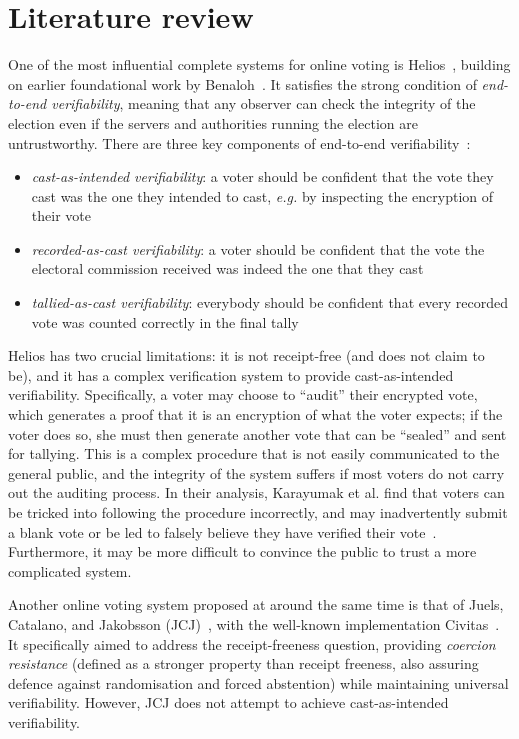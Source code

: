 \documentclass[12pt,a4paper]{article}
\theoremstyle{definition}
\newcommand{\eg}{\textit{e.g. }}
\begin{document}
\section{Literature review}\label{sec-litrev}
One of the most influential complete systems for online voting is Helios~\cite{adida2008helios}, building on earlier foundational work by Benaloh~\cite{benaloh2006simple}. It satisfies the strong condition of \textit{end-to-end verifiability}, meaning that any observer can check the integrity of the election even if the servers and authorities running the election are untrustworthy. There are three key components of end-to-end verifiability~\cite{DBLP:journals/corr/BenalohRRSTV15}:

\begin{itemize}
    \item \textit{cast-as-intended verifiability}: a voter should be confident that the vote they cast was the one they intended to cast, \eg by inspecting the encryption of their vote
    \item \textit{recorded-as-cast verifiability}: a voter should be confident that the vote the electoral commission received was indeed the one that they cast
    \item \textit{tallied-as-cast verifiability}: everybody should be confident that every recorded vote was counted correctly in the final tally
\end{itemize}

Helios has two crucial limitations: it is not receipt-free (and does not claim to be), and it has a complex verification system to provide cast-as-intended verifiability. Specifically, a voter may choose to ``audit'' their encrypted vote, which generates a proof that it is an encryption of what the voter expects; if the voter does so, she must then generate another vote that can be ``sealed'' and sent for tallying. This is a complex procedure that is not easily communicated to the general public, and the integrity of the system suffers if most voters do not carry out the auditing process. In their analysis, Karayumak et al. find that voters can be tricked into following the procedure incorrectly, and may inadvertently submit a blank vote or be led to falsely believe they have verified their vote~\cite{karayumak2011usability}. Furthermore, it may be more difficult to convince the public to trust a more complicated system.

Another online voting system proposed at around the same time is that of Juels, Catalano, and Jakobsson (JCJ)~\cite{juels2010coercion}, with the well-known implementation Civitas~\cite{clarkson2008civitas}. It specifically aimed to address the receipt-freeness question, providing \textit{coercion resistance} (defined as a stronger property than receipt freeness, also assuring defence against randomisation and forced abstention) while maintaining universal verifiability. However, JCJ does not attempt to achieve cast-as-intended verifiability.
\end{document}

